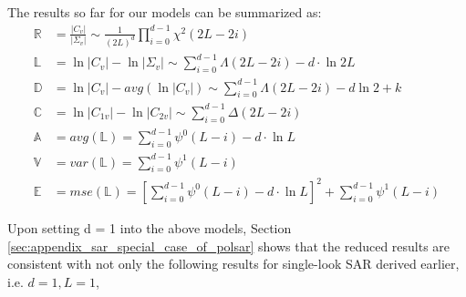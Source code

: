 The results so far for our models can be summarized as:
{\footnotesize
\begin{align}
  \mathbb{R} &= \frac{|C_v|}{|\Sigma_v|} \sim \frac{1}{(2L)^d} \prod^{d-1}_{i=0} \chi^2(2L-2i) \\%
  \mathbb{L} &= \ln{|C_v|} - \ln{|\Sigma_v|} \sim \sum^{d-1}_{i=0} \Lambda(2L-2i) - d \cdot \ln{2L} \\ %
  \mathbb{D} &= \ln{|C_v|} - avg(\ln{|C_v|}) \sim \sum^{d-1}_{i=0} \Lambda(2L-2i) - d \ln{2} + k\\
  \mathbb{C} &= \ln{|C_{1v}|} - \ln{|C_{2v}|} \sim \sum^{d-1}_{i=0} \Delta(2L-2i) \\
  \mathbb{A} &= avg(\mathbb{L}) = \sum^{d-1}_{i=0} \psi^0(L-i) - d \cdot \ln{L} \\ %
  \mathbb{V} &= var(\mathbb{L}) = \sum^{d-1}_{i=0} \psi^1(L-i) \\ %
  \mathbb{E} &= mse(\mathbb{L}) =\left[ \sum^{d-1}_{i=0} \psi^0(L-i) - d \cdot \ln{L} \right]^2 +  \sum^{d-1}_{i=0} \psi^1(L-i) %
\end{align}
}%

Upon setting d = 1 into the above models,
  Section \ref{sec:appendix_sar_special_case_of_polsar} shows that the reduced results
are consistent with not only the following results for single-look SAR derived earlier, i.e. $d =1,  L = 1$,

